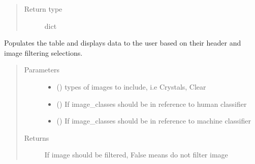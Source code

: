 \documentclass[letterpaper,10pt,english]{sphinxmanual}
\begin{document}
\begin{fulllineitems}
\begin{fulllineitems}
\begin{quote}
\begin{description}
\item[{Return type}] \leavevmode
dict

\end{description}\end{quote}

\end{fulllineitems}


\begin{fulllineitems}
\label{\detokenize{polo.widgets:polo.widgets.table_viewer.TableViewer.populate_table}}
Populates the table and displays data to the user based on their
header and image filtering selections.
\begin{quote}\begin{description}
\item[{Parameters}] \leavevmode\begin{itemize}
\item {} 
 () \textendash{} types of images to include, i.e Crystals, Clear

\item {} 
 () \textendash{} If image\_classes should be in reference to human classifier

\item {} 
 () \textendash{} If image\_classes should be in reference to machine classifier

\end{itemize}

\item[{Returns}] \leavevmode
If image should be filtered, False means do not filter image

\end{description}\end{quote}

\end{fulllineitems}


\end{fulllineitems}
\end{document}
